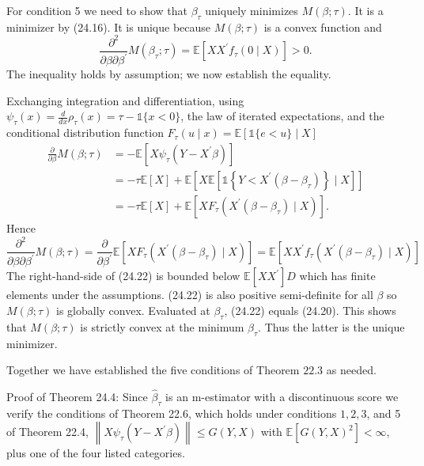 \documentclass[10pt]{article}
\begin{document}
For condition 5 we need to show that $\beta_{\tau}$ uniquely minimizes $M(\beta ; \tau)$. It is a minimizer by (24.16). It is unique because $M(\beta ; \tau)$ is a convex function and
$$
\frac{\partial^{2}}{\partial \beta \partial \beta^{\prime}} M\left(\beta_{\tau} ; \tau\right)=\mathbb{E}\left[X X^{\prime} f_{\tau}(0 \mid X)\right]>0 .
$$
The inequality holds by assumption; we now establish the equality.

Exchanging integration and differentiation, using $\psi_{\tau}(x)=\frac{d}{d x} \rho_{\tau}(x)=\tau-\mathbb{1}\{x<0\}$, the law of iterated expectations, and the conditional distribution function $F_{\tau}(u \mid x)=\mathbb{E}[\mathbb{1}\{e<u\} \mid X]$
$$
\begin{aligned}
\frac{\partial}{\partial \beta} M(\beta ; \tau) &=-\mathbb{E}\left[X \psi_{\tau}\left(Y-X^{\prime} \beta\right)\right] \\
&=-\tau \mathbb{E}[X]+\mathbb{E}\left[X \mathbb{E}\left[\mathbb{1}\left\{Y<X^{\prime}\left(\beta-\beta_{\tau}\right)\right\} \mid X\right]\right] \\
&=-\tau \mathbb{E}[X]+\mathbb{E}\left[X F_{\tau}\left(X^{\prime}\left(\beta-\beta_{\tau}\right) \mid X\right)\right] .
\end{aligned}
$$
Hence
$$
\frac{\partial^{2}}{\partial \beta \partial \beta^{\prime}} M(\beta ; \tau)=\frac{\partial}{\partial \beta^{\prime}} \mathbb{E}\left[X F_{\tau}\left(X^{\prime}\left(\beta-\beta_{\tau}\right) \mid X\right)\right]=\mathbb{E}\left[X X^{\prime} f_{\tau}\left(X^{\prime}\left(\beta-\beta_{\tau}\right) \mid X\right)\right]
$$
The right-hand-side of (24.22) is bounded below $\mathbb{E}\left[X X^{\prime}\right] D$ which has finite elements under the assumptions. (24.22) is also positive semi-definite for all $\beta$ so $M(\beta ; \tau)$ is globally convex. Evaluated at $\beta_{\tau}$, (24.22) equals (24.20). This shows that $M(\beta ; \tau)$ is strictly convex at the minimum $\beta_{\tau}$. Thus the latter is the unique minimizer.

Together we have established the five conditions of Theorem $22.3$ as needed.

Proof of Theorem 24.4: Since $\widehat{\beta}_{\tau}$ is an m-estimator with a discontinuous score we verify the conditions of Theorem 22.6, which holds under conditions $1,2,3$, and 5 of Theorem 22.4, $\left\|X \psi_{\tau}\left(Y-X^{\prime} \beta\right)\right\| \leq G(Y, X)$ with $\mathbb{E}\left[G(Y, X)^{2}\right]<\infty$, plus one of the four listed categories.
\end{document}
